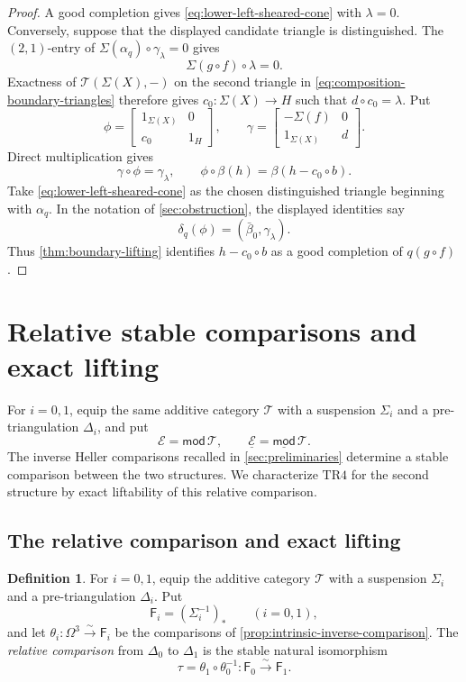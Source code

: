 \documentclass[a4paper,11pt,reqno]{amsart}
\theoremstyle{definition}
\newtheorem{definition}[definition]{Definition}
\theoremstyle{plain}
\numberwithin{equation}{section}
\newcommand{\T}{\mathcal T}
\begin{document}
\begin{proof}
A good completion gives \eqref{eq:lower-left-sheared-cone} with
\(\lambda=0\).  Conversely, suppose that the displayed candidate triangle is
distinguished.  The $(2,1)$-entry of
\(\Sigma(\alpha_q)\circ\gamma_\lambda=0\) gives
\[
 \Sigma(g\circ f)\circ\lambda=0.
\]
Exactness of \(\T(\Sigma(X),-)\) on the second triangle in
\eqref{eq:composition-boundary-triangles} therefore gives
\(c_0:\Sigma(X)\to H\) such that \(d\circ c_0=\lambda\).  Put
\[
 \phi=
 \begin{bmatrix}1_{\Sigma(X)}&0\\c_0&1_H\end{bmatrix},
 \qquad
 \gamma=
 \begin{bmatrix}-\Sigma(f)&0\\1_{\Sigma(X)}&d\end{bmatrix}.
\]
Direct multiplication gives
\[
 \gamma\circ\phi=\gamma_\lambda,
 \qquad
 \phi\circ\beta(h)=\beta(h-c_0\circ b).
\]
Take \eqref{eq:lower-left-sheared-cone} as the chosen distinguished
triangle beginning with \(\alpha_q\).  In the notation of
\cref{sec:obstruction}, the displayed identities say
\[
 \delta_q(\phi)=(\bar\beta_0,\gamma_\lambda).
\]
Thus \cref{thm:boundary-lifting} identifies \(h-c_0\circ b\) as a good
completion of \(q(g\circ f)\).
\end{proof}

\section{Relative stable comparisons and exact lifting}
\label{sec:relative-heller}

For \(i=0,1\), equip the same additive category \(\T\) with a suspension
\(\Sigma_i\) and a pre-triangulation \(\Delta_i\), and put
\[
 \mathcal E=\mathsf{mod}\,\T,
 \qquad
 \underline{\mathcal E}=\underline{\mathsf{mod}}\,\T.
\]
The inverse Heller comparisons recalled in
\cref{sec:preliminaries} determine a stable comparison between the two
structures.  We characterize \(\mathrm{TR4}\) for the second structure
by exact liftability of this relative comparison.

\subsection{The relative comparison and exact lifting}
\begin{definition}
\label{def:relative-comparison}
For \(i=0,1\), equip the additive category \(\T\) with a suspension
\(\Sigma_i\) and a pre-triangulation \(\Delta_i\).  Put
\[
 \mathsf F_i=(\Sigma_i^{-1})_*\qquad(i=0,1),
\]
and let \(\theta_i:\Omega^3\xrightarrow{\sim}\mathsf F_i\) be the
comparisons of \cref{prop:intrinsic-inverse-comparison}.  The
\emph{relative comparison} from \(\Delta_0\) to \(\Delta_1\) is the stable
natural isomorphism
\begin{equation}
\label{eq:relative-heller-comparison}
 \tau=\theta_1\circ\theta_0^{-1}:
 \mathsf F_0\xrightarrow{\sim}\mathsf F_1.
\end{equation}
\end{definition}
\end{document}
